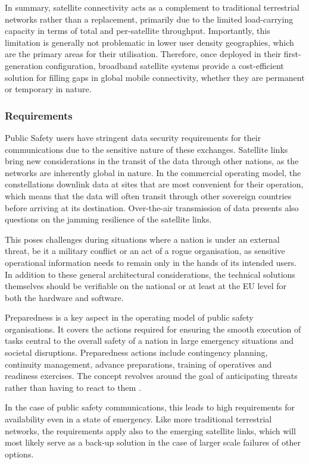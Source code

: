 \documentclass[english, 12pt, a4paper, elec, utf8, a-1b, online]{aaltothesis}
\begin{document}
In summary, satellite connectivity acts as a complement to traditional terrestrial networks rather than a replacement, primarily due to the limited load-carrying capacity in terms of total and per-satellite throughput.
Importantly, this limitation is generally not problematic in lower user density geographies, which are the primary areas for their utilisation.
Therefore, once deployed in their first-generation configuration, broadband satellite systems provide a cost-efficient solution for filling gaps in global mobile connectivity, whether they are permanent or temporary in nature.

\subsubsection{Requirements}

Public Safety users have stringent data security requirements for their communications due to the sensitive nature of these exchanges.
Satellite links bring new considerations in the transit of the data through other nations, as the networks are inherently global in nature.
In the commercial operating model, the constellations downlink data at sites that are most convenient for their operation, which means that the data will often transit through other sovereign countries before arriving at its destination.
Over-the-air transmission of data presents also questions on the jamming resilience of the satellite links.

This poses challenges during situations where a nation is under an external threat, be it a military conflict or an act of a rogue organisation, as sensitive operational information needs to remain only in the hands of its intended users. In addition to these general architectural considerations, the technical solutions themselves should be verifiable on the national or at least at the EU level for both the hardware and software.

Preparedness is a key aspect in the operating model of public safety organisations. It covers the actions required for ensuring the smooth execution of tasks central to the overall safety of a nation in large emergency situations and societal disruptions. Preparedness actions include contingency planning, continuity management, advance preparations, training of operatives and readiness exercises. The concept revolves around the goal of anticipating threats rather than having to react to them \cite{turvallisuuskomitea-ennakointi-varautuminen}.

In the case of public safety communications, this leads to high requirements for availability even in a state of emergency.
Like more traditional terrestrial networks, the requirements apply also to the emerging satellite links, which will most likely serve as a back-up solution in the case of larger scale failures of other options.
\end{document}
